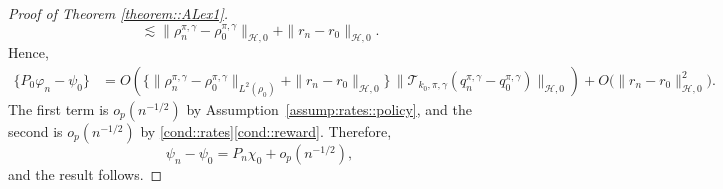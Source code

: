 \documentclass[11pt]{article}
\theoremstyle{plain}
\begin{document}
\begin{proof}[Proof of Theorem \ref{theorem::ALex1}]
\[\lesssim
\|\rho_n^{\pi,\gamma} - \rho_0^{\pi,\gamma}\|_{\mathcal{H}, 0}
+ \|r_n - r_0\|_{\mathcal{H},0}.
\]
Hence,
\begin{align*}
   \{P_0 \varphi_n - \psi_0\}
   &= O\!\left(
        \{\|\rho_n^{\pi,\gamma} - \rho_0^{\pi,\gamma}\|_{L^2(\rho_0)}
          + \|r_n - r_0\|_{\mathcal{H}, 0}\}\,
        \|\mathcal{T}_{k_0,\pi,\gamma}(q_n^{\pi,\gamma} - q_0^{\pi,\gamma})\|_{\mathcal{H}, 0}
      \right)
      + O\bigl(\|r_n - r_0\|_{\mathcal{H}, 0}^2\bigr).
\end{align*}
The first term is $o_p(n^{-1/2})$ by Assumption~\ref{assump:rates::policy}, and the second is $o_p(n^{-1/2})$ by \ref{cond::rates}\ref{cond::reward}. Therefore,
\[
\psi_n - \psi_0
= P_n \chi_0 + o_p(n^{-1/2}),
\]
and the result follows.
\end{proof}
\end{document}
